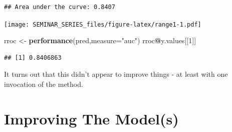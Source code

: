 \documentclass[
]{book}
\newenvironment{Shaded}{\begin{snugshade}}{\end{snugshade}}
\newcommand{\DataTypeTok}[1]{\textcolor[rgb]{0.13,0.29,0.53}{#1}}
\newcommand{\DecValTok}[1]{\textcolor[rgb]{0.00,0.00,0.81}{#1}}
\newcommand{\FloatTok}[1]{\textcolor[rgb]{0.00,0.00,0.81}{#1}}
\newcommand{\KeywordTok}[1]{\textcolor[rgb]{0.13,0.29,0.53}{\textbf{#1}}}
\newcommand{\NormalTok}[1]{#1}
\newcommand{\OperatorTok}[1]{\textcolor[rgb]{0.81,0.36,0.00}{\textbf{#1}}}
\newcommand{\StringTok}[1]{\textcolor[rgb]{0.31,0.60,0.02}{#1}}
\begin{document}
\begin{verbatim}
## Area under the curve: 0.8407
\end{verbatim}

\begin{Shaded}
\end{Shaded}

\texttt{[image: SEMINAR\_SERIES\_files/figure-latex/range1-1.pdf]}

\begin{Shaded}
\begin{Highlighting}[]
\NormalTok{rroc <-}\StringTok{ }\KeywordTok{performance}\NormalTok{(pred,}\DataTypeTok{measure=}\StringTok{"auc"}\NormalTok{)}
\NormalTok{rroc}\OperatorTok{@}\NormalTok{y.values[[}\DecValTok{1}\NormalTok{]]}
\end{Highlighting}
\end{Shaded}

\begin{verbatim}
## [1] 0.8406863
\end{verbatim}

It turns out that this didn't appear to improve things - at least with one invocation of the method.

\hypertarget{improving-the-models}{%
\section{Improving The Model(s)}\label{improving-the-models}}
\end{document}
